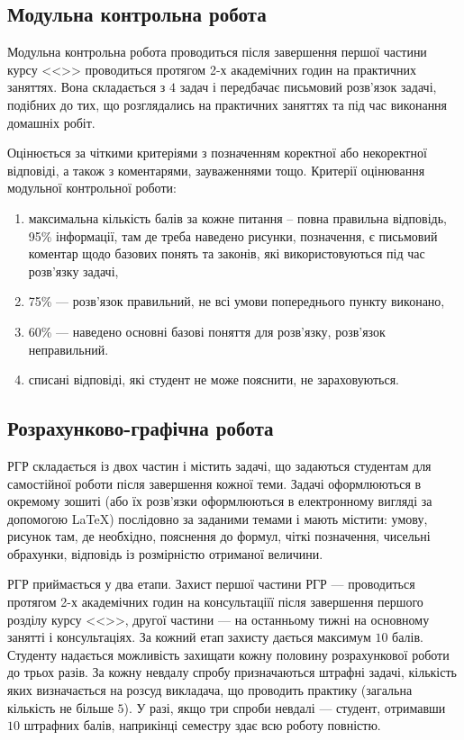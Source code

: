 \documentclass{Syllabus}
\begin{document}
\subsection*{Модульна контрольна робота}


Модульна контрольна робота проводиться після завершення першої частини курсу <<\discipline>> проводиться протягом 2-х академічних годин на практичних заняттях. Вона складається з $4$ задач і передбачає письмовий розв’язок задачі, подібних до тих, що розглядались на практичних заняттях та під час виконання домашніх робіт.

Оцінюється за чіткими критеріями з позначенням коректної або некоректної відповіді, а також з коментарями, зауваженнями тощо. Критерії оцінювання модульної контрольної роботи:
\begin{enumerate}[label=$\bullet$]
\item максимальна кількість балів за кожне питання – повна правильна відповідь, 95\% інформації, там де треба наведено рисунки, позначення, є письмовий коментар щодо базових понять та законів, які використовуються під час розв’язку задачі,
\item 75\%  --- розв’язок правильний, не всі умови попереднього пункту виконано,
\item 60\%  --- наведено основні базові поняття для розв’язку, розв’язок неправильний.
\item списані відповіді, які студент не може пояснити, не зараховуються.
\end{enumerate}


\subsection*{Розрахунково-графічна робота}


РГР складається із двох частин і містить задачі, що задаються студентам для самостійної роботи після завершення кожної теми. Задачі оформлюються в окремому зошиті (або їх розв'язки оформлюються в електронному вигляді за допомогою \LaTeX{}) послідовно за заданими темами і мають містити: умову, рисунок там, де необхідно, пояснення до формул, чіткі позначення, чисельні обрахунки, відповідь із розмірністю отриманої величини.

РГР приймається у два етапи. Захист першої частини РГР --- проводиться протягом 2-х академічних годин на консультаціїї після завершення першого розділу курсу <<\discipline>>, другої частини --- на останньому тижні на основному занятті і консультаціях. За кожний етап захисту дається максимум $10$ балів. Студенту надається можливість захищати кожну половину розрахункової роботи до трьох разів. За кожну невдалу спробу призначаються штрафні задачі, кількість яких визначається на розсуд викладача, що проводить практику (загальна кількість не більше $5$). У разі, якщо три спроби невдалі --- студент, отримавши $10$ штрафних балів, наприкінці семестру здає всю роботу повністю.
\end{document}
